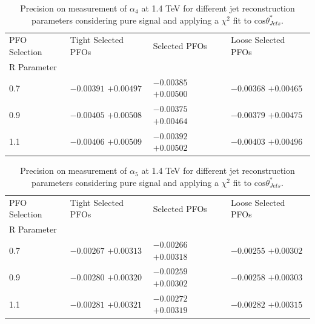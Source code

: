 \begin{table}[h!]
\centering
\begin{tabular}{ l l l l }
\hline
PFO Selection & Tight Selected PFOs & Selected PFOs & Loose Selected PFOs \\ 
R Parameter & & & \\ 
\hline
0.7 & $-0.00391$ $+0.00497$ & $-0.00385$ $+0.00500$ & $-0.00368$ $+0.00465$ \\
0.9 & $-0.00405$ $+0.00508$ & $-0.00375$ $+0.00464$ & $-0.00379$ $+0.00475$ \\
1.1 & $-0.00406$ $+0.00509$ & $-0.00392$ $+0.00502$ & $-0.00403$ $+0.00496$ \\
\hline
\end{tabular}
\caption[$1\sigma$ precision on measurement of $\alpha_{4}$ for different jet reconstruction parameters considering pure signal at 1.4 TeV.]{Precision on measurement of $\alpha_{4}$ at 1.4 TeV for different jet reconstruction parameters considering pure signal and applying a $\chi^{2}$ fit to $\text{cos}\theta^{*}_{Jets}$.}
\label{table:precisiona4signaljetalgo1400GeV}
\end{table}

\begin{table}[h!]
\centering
\begin{tabular}{ l l l l }
\hline
PFO Selection & Tight Selected PFOs & Selected PFOs & Loose Selected PFOs \\ 
R Parameter & & & \\ 
\hline
0.7 & $-0.00267$ $+0.00313$ & $-0.00266$ $+0.00318$ & $-0.00255$ $+0.00302$ \\
0.9 & $-0.00280$ $+0.00320$ & $-0.00259$ $+0.00302$ & $-0.00258$ $+0.00303$ \\
1.1 & $-0.00281$ $+0.00321$ & $-0.00272$ $+0.00319$ & $-0.00282$ $+0.00315$ \\
\hline
\end{tabular}
\caption[$1\sigma$ precision on measurement of $\alpha_{5}$ for different jet reconstruction parameters considering pure signal at 1.4 TeV.]{Precision on measurement of $\alpha_{5}$ at 1.4 TeV for different jet reconstruction parameters considering pure signal and applying a $\chi^{2}$ fit to $\text{cos}\theta^{*}_{Jets}$.}
\label{table:precisiona5signaljetalgo1400GeV}
\end{table}


